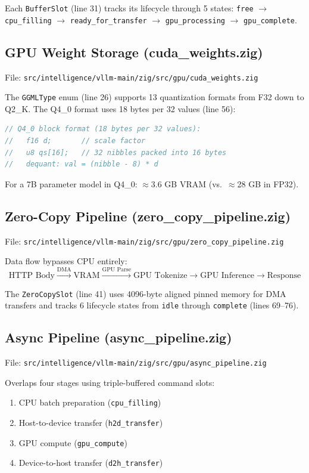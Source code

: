 \documentclass[11pt]{article}
\begin{document}
Each \texttt{BufferSlot} (line 31) tracks its lifecycle through 5 states:
\texttt{free} $\to$ \texttt{cpu\_filling} $\to$ \texttt{ready\_for\_transfer}
$\to$ \texttt{gpu\_processing} $\to$ \texttt{gpu\_complete}.

\subsection{GPU Weight Storage (cuda\_weights.zig)}

File: \texttt{src/intelligence/vllm-main/zig/src/gpu/cuda\_weights.zig}

The \texttt{GGMLType} enum (line 26) supports 13 quantization formats from F32
down to Q2\_K. The Q4\_0 format uses 18 bytes per 32 values (line 56):

\begin{lstlisting}[language=C,caption={Q4\_0 block format (cuda\_weights.zig:5--9)}]
// Q4_0 block format (18 bytes per 32 values):
//   f16 d;       // scale factor
//   u8 qs[16];   // 32 nibbles packed into 16 bytes
//   dequant: val = (nibble - 8) * d
\end{lstlisting}

For a 7B parameter model in Q4\_0: $\approx$3.6 GB VRAM (vs.\ $\approx$28 GB in FP32).

\subsection{Zero-Copy Pipeline (zero\_copy\_pipeline.zig)}

File: \texttt{src/intelligence/vllm-main/zig/src/gpu/zero\_copy\_pipeline.zig}

Data flow bypasses CPU entirely:
\[
\text{HTTP Body} \xrightarrow{\text{DMA}} \text{VRAM}
\xrightarrow{\text{GPU Parse}} \text{GPU Tokenize}
\xrightarrow{} \text{GPU Inference} \to \text{Response}
\]

The \texttt{ZeroCopySlot} (line 41) uses 4096-byte aligned pinned memory for
DMA transfers and tracks 6 lifecycle states from \texttt{idle} through
\texttt{complete} (lines 69--76).

\subsection{Async Pipeline (async\_pipeline.zig)}

File: \texttt{src/intelligence/vllm-main/zig/src/gpu/async\_pipeline.zig}

Overlaps four stages using triple-buffered command slots:
\begin{enumerate}
  \item CPU batch preparation (\texttt{cpu\_filling})
  \item Host-to-device transfer (\texttt{h2d\_transfer})
  \item GPU compute (\texttt{gpu\_compute})
  \item Device-to-host transfer (\texttt{d2h\_transfer})
\end{enumerate}
\end{document}

